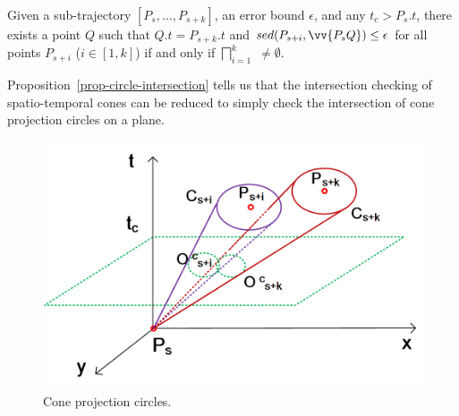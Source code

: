 \begin{prop}
\label{prop-circle-intersection}
Given a sub-trajectory $[P_s,\ldots, P_{s+k}]$, an error bound $\epsilon$, and any $t_c > P_s.t$, there exists a point $Q$ such that $Q.t = P_{s+k}.t$ and $sed(P_{s+i}, \vv{P_sQ})\le \epsilon$ for all points $P_{s+i}$ ($i \in [1,k]$) if and only if $\bigsqcap_{i=1}^{k}$ $\ne \emptyset$.
\end{prop}



Proposition~\ref{prop-circle-intersection} tells us that the intersection checking of spatio-temporal cones can be reduced to simply check the intersection of cone projection circles on a plane. %

\begin{figure}[tb!]
	\centering
	\includegraphics[scale=0.7]{figures/Fig-project-circle.png}
	\caption{\small Cone projection circles.}
	\vspace{-1ex}
	\label{fig:pcircle}
\end{figure}


